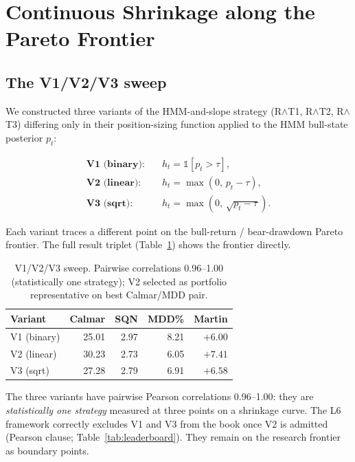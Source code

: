 \documentclass[11pt]{article}
\begin{document}
\section{Continuous Shrinkage along the Pareto Frontier}
\label{sec:shrinkage}

\subsection{The V1/V2/V3 sweep}

We constructed three variants of the HMM-and-slope strategy (R$\wedge$T1,
R$\wedge$T2, R$\wedge$T3) differing only in their position-sizing function
applied to the HMM bull-state posterior $p_t$:

\begin{align*}
\textbf{V1 (binary):}    \quad &h_t = \mathbb{1}[p_t > \tau], \\
\textbf{V2 (linear):}    \quad &h_t = \max(0, \, p_t - \tau), \\
\textbf{V3 (sqrt):}      \quad &h_t = \max(0, \, \sqrt{p_t - \tau}).
\end{align*}

Each variant traces a different point on the bull-return / bear-drawdown
Pareto frontier. The full result triplet (Table~\ref{tab:vsweep}) shows the
frontier directly.

\begin{table}[h]
\centering
\small
\begin{tabular}{lrrrr}
\toprule
Variant & Calmar & SQN & MDD\% & Martin \\
\midrule
V1 (binary) & 25.01 & 2.97 & 8.21 & $+6.00$ \\
V2 (linear) & 30.23 & 2.73 & 6.05 & $+7.41$ \\
V3 (sqrt)   & 27.28 & 2.79 & 6.91 & $+6.58$ \\
\bottomrule
\end{tabular}
\caption{V1/V2/V3 sweep. Pairwise correlations 0.96--1.00 (statistically
one strategy); V2 selected as portfolio representative on best Calmar/MDD
pair.}
\label{tab:vsweep}
\end{table}

The three variants have pairwise Pearson correlations 0.96--1.00: they are
\emph{statistically one strategy} measured at three points on a shrinkage
curve. The L6 framework correctly excludes V1 and V3 from the book once V2
is admitted (Pearson clause; Table~\ref{tab:leaderboard}). They remain on
the research frontier as boundary points.
\end{document}
